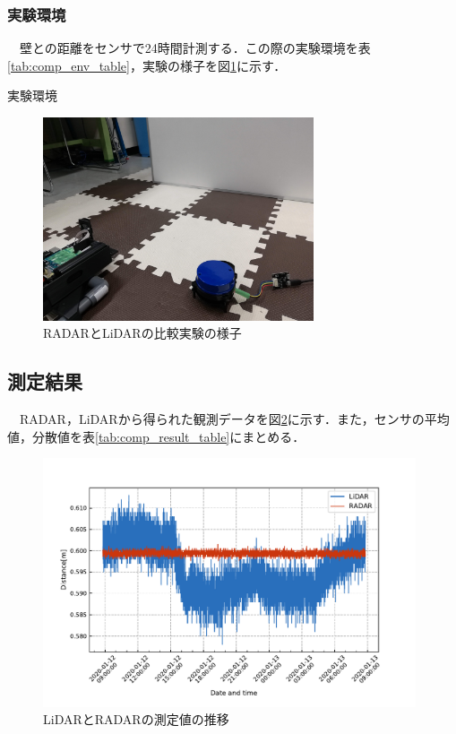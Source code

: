 \subsubsection{実験環境}
　壁との距離をセンサで24時間計測する．この際の実験環境を表\ref{tab:comp_env_table}，実験の様子を図\ref{fig:comparison_measure_environment}に示す．

\begin{table}[htbp]
    \centering
    \caption{実験環境}
    
    \label{tab:comp_env_table}
\end{table}

\begin{figure}[H]
    \centering
    \includegraphics[width=8cm]{./fig/comparison_measure_environment.jpg}
    \caption{RADARとLiDARの比較実験の様子}
    \label{fig:comparison_measure_environment}
\end{figure}

\subsection{測定結果}
　RADAR，LiDARから得られた観測データを図\ref{fig:comparison_raw}に示す．また，センサの平均値，分散値を表\ref{tab:comp_result_table}にまとめる．
\begin{figure}[H]
    \centering
    \includegraphics[width=11cm]{./fig/comparison_raw.pdf}
    \caption{LiDARとRADARの測定値の推移}
    \label{fig:comparison_raw}
\end{figure}

